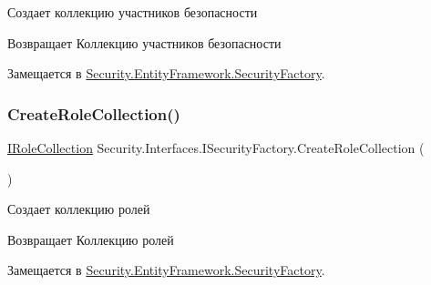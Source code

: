 Создает коллекцию участников безопасности 

\begin{DoxyReturn}{Возвращает}
Коллекцию участников безопасности
\end{DoxyReturn}


Замещается в \hyperlink{class_security_1_1_entity_framework_1_1_security_factory_a46e859ae40869883722f3475a35f6eeb}{Security.\+Entity\+Framework.\+Security\+Factory}.

\mbox{\label{interface_security_1_1_interfaces_1_1_i_security_factory_a7c007d1bc58724fb8a546ac67a4ad649}} 
\subsubsection{\texorpdfstring{Create\+Role\+Collection()}{CreateRoleCollection()}}
{\footnotesize\ttfamily \hyperlink{interface_security_1_1_interfaces_1_1_collections_1_1_i_role_collection}{I\+Role\+Collection} Security.\+Interfaces.\+I\+Security\+Factory.\+Create\+Role\+Collection (\begin{DoxyParamCaption}{ }\end{DoxyParamCaption})}



Создает коллекцию ролей 

\begin{DoxyReturn}{Возвращает}
Коллекцию ролей
\end{DoxyReturn}


Замещается в \hyperlink{class_security_1_1_entity_framework_1_1_security_factory_aec7cc1f83c7aed01e98f853a5ddf618e}{Security.\+Entity\+Framework.\+Security\+Factory}.

\mbox{\label{interface_security_1_1_interfaces_1_1_i_security_factory_aa03c6ad65ac4dcf14f35f8ed659cf930}} 
